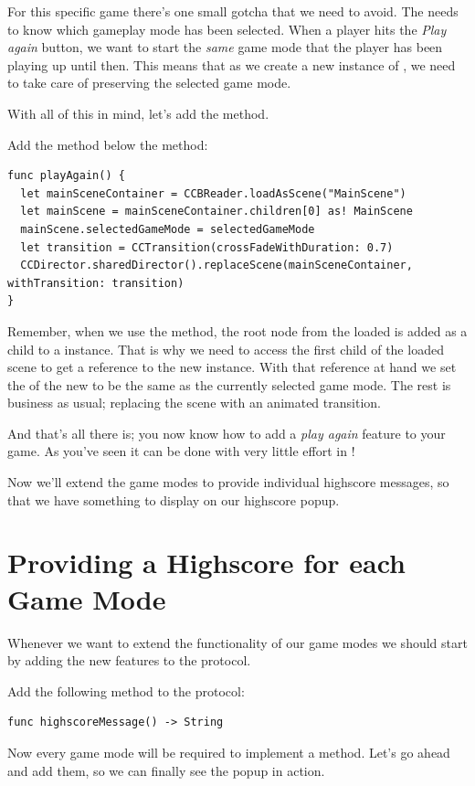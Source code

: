 For this specific game there's one small gotcha that we need to avoid. The
 needs to know which gameplay mode has been selected. When
a player hits the \textit{Play again} button, we want to start the \textit{same}
game mode that the player has been playing up until then. This means that as we
create a new instance of , we need to take care of
preserving the selected game mode.

With all of this in mind, let's add the  method.
\begin{leftbar}
Add the  method below the  method:
\begin{lstlisting}
func playAgain() {
  let mainSceneContainer = CCBReader.loadAsScene("MainScene")
  let mainScene = mainSceneContainer.children[0] as! MainScene
  mainScene.selectedGameMode = selectedGameMode
  let transition = CCTransition(crossFadeWithDuration: 0.7)
  CCDirector.sharedDirector().replaceScene(mainSceneContainer, withTransition: transition)
}
\end{lstlisting}
\end{leftbar}
Remember, when we use the  method, the
root node from the loaded \ccbfile{} is added as a child to a
\ccscene{} instance. That is why we need to access the first child of the
loaded scene to get a reference to the new  instance. With that reference
at hand we set the  of the new  to
be the same as the currently selected game mode. The rest is business as usual;
replacing the scene with an animated transition.

And that's all there is; you now know how to add a \textit{play again} feature
to your game. As you've seen it can be done with very little effort in \cocos{}!

Now we'll extend the game modes to provide individual highscore messages, so
that we have something to display on our highscore popup.

\section{Providing a Highscore for each Game Mode}
Whenever we want to extend the functionality of our game modes we should start
by adding the new features to the  protocol.
\begin{leftbar}
Add the following method to the  protocol:
\begin{lstlisting}
func highscoreMessage() -> String
\end{lstlisting}
\end{leftbar}
Now every game mode will be required to implement a
 method. Let's go ahead and add them, so we can
finally see the popup in action.

